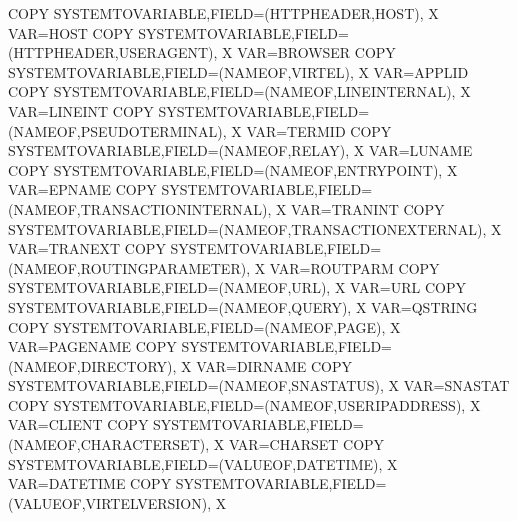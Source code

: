 \documentclass[letterpaper,10pt,english]{sphinxmanual}
\begin{document}
\begin{sphinxVerbatim}[commandchars=\\\{\}]
COPY\PYGZdl{} SYSTEM\PYGZhy{}TO\PYGZhy{}VARIABLE,FIELD=(HTTP\PYGZhy{}HEADER,HOST),             X
    VAR=\PYGZsq{}HOST\PYGZsq{}
COPY\PYGZdl{} SYSTEM\PYGZhy{}TO\PYGZhy{}VARIABLE,FIELD=(HTTP\PYGZhy{}HEADER,USER\PYGZhy{}AGENT),       X
    VAR=\PYGZsq{}BROWSER\PYGZsq{}
COPY\PYGZdl{} SYSTEM\PYGZhy{}TO\PYGZhy{}VARIABLE,FIELD=(NAME\PYGZhy{}OF,VIRTEL),               X
    VAR=\PYGZsq{}APPLID\PYGZsq{}
COPY\PYGZdl{} SYSTEM\PYGZhy{}TO\PYGZhy{}VARIABLE,FIELD=(NAME\PYGZhy{}OF,LINE\PYGZhy{}INTERNAL),        X
    VAR=\PYGZsq{}LINEINT\PYGZsq{}
COPY\PYGZdl{} SYSTEM\PYGZhy{}TO\PYGZhy{}VARIABLE,FIELD=(NAME\PYGZhy{}OF,PSEUDO\PYGZhy{}TERMINAL),      X
    VAR=\PYGZsq{}TERMID\PYGZsq{}
COPY\PYGZdl{} SYSTEM\PYGZhy{}TO\PYGZhy{}VARIABLE,FIELD=(NAME\PYGZhy{}OF,RELAY),                X
    VAR=\PYGZsq{}LUNAME\PYGZsq{}
COPY\PYGZdl{} SYSTEM\PYGZhy{}TO\PYGZhy{}VARIABLE,FIELD=(NAME\PYGZhy{}OF,ENTRY\PYGZhy{}POINT),          X
    VAR=\PYGZsq{}EPNAME\PYGZsq{}
COPY\PYGZdl{} SYSTEM\PYGZhy{}TO\PYGZhy{}VARIABLE,FIELD=(NAME\PYGZhy{}OF,TRANSACTION\PYGZhy{}INTERNAL), X
    VAR=\PYGZsq{}TRANINT\PYGZsq{}
COPY\PYGZdl{} SYSTEM\PYGZhy{}TO\PYGZhy{}VARIABLE,FIELD=(NAME\PYGZhy{}OF,TRANSACTION\PYGZhy{}EXTERNAL), X
    VAR=\PYGZsq{}TRANEXT\PYGZsq{}
COPY\PYGZdl{} SYSTEM\PYGZhy{}TO\PYGZhy{}VARIABLE,FIELD=(NAME\PYGZhy{}OF,ROUTING\PYGZhy{}PARAMETER),    X
    VAR=\PYGZsq{}ROUTPARM\PYGZsq{}
COPY\PYGZdl{} SYSTEM\PYGZhy{}TO\PYGZhy{}VARIABLE,FIELD=(NAME\PYGZhy{}OF,URL),                  X
    VAR=\PYGZsq{}URL\PYGZsq{}
COPY\PYGZdl{} SYSTEM\PYGZhy{}TO\PYGZhy{}VARIABLE,FIELD=(NAME\PYGZhy{}OF,QUERY),                X
    VAR=\PYGZsq{}QSTRING\PYGZsq{}
COPY\PYGZdl{} SYSTEM\PYGZhy{}TO\PYGZhy{}VARIABLE,FIELD=(NAME\PYGZhy{}OF,PAGE),                 X
    VAR=\PYGZsq{}PAGENAME\PYGZsq{}
COPY\PYGZdl{} SYSTEM\PYGZhy{}TO\PYGZhy{}VARIABLE,FIELD=(NAME\PYGZhy{}OF,DIRECTORY),            X
    VAR=\PYGZsq{}DIRNAME\PYGZsq{}
COPY\PYGZdl{} SYSTEM\PYGZhy{}TO\PYGZhy{}VARIABLE,FIELD=(NAME\PYGZhy{}OF,SNA\PYGZhy{}STATUS),           X
    VAR=\PYGZsq{}SNASTAT\PYGZsq{}
COPY\PYGZdl{} SYSTEM\PYGZhy{}TO\PYGZhy{}VARIABLE,FIELD=(NAME\PYGZhy{}OF,USER\PYGZhy{}IP\PYGZhy{}ADDRESS),      X
    VAR=\PYGZsq{}CLIENT\PYGZsq{}
COPY\PYGZdl{} SYSTEM\PYGZhy{}TO\PYGZhy{}VARIABLE,FIELD=(NAME\PYGZhy{}OF,CHARACTER\PYGZhy{}SET),        X
    VAR=\PYGZsq{}CHARSET\PYGZsq{}
COPY\PYGZdl{} SYSTEM\PYGZhy{}TO\PYGZhy{}VARIABLE,FIELD=(VALUE\PYGZhy{}OF,DATE\PYGZhy{}TIME),           X
    VAR=\PYGZsq{}DATETIME\PYGZsq{}
COPY\PYGZdl{} SYSTEM\PYGZhy{}TO\PYGZhy{}VARIABLE,FIELD=(VALUE\PYGZhy{}OF,VIRTEL\PYGZhy{}VERSION),      X

\end{sphinxVerbatim}
\end{document}
